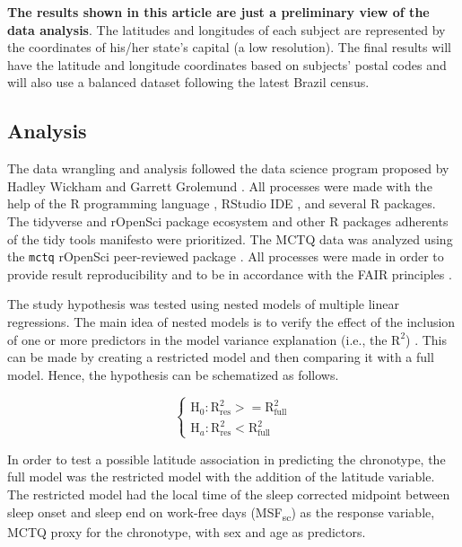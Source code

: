 \documentclass[
12pt,
openright,
oneside,
a4paper,
chapter=TITLE,
section=TITLE,
french,
spanish,
brazil,
english
]{abntex2}\usepackage{array}
\begin{document}
\textbf{The results shown in this article are just a preliminary view of
the data analysis}. The latitudes and longitudes of each subject are
represented by the coordinates of his/her state's capital (a low
resolution). The final results will have the latitude and longitude
coordinates based on subjects' postal codes and will also use a balanced
dataset following the latest Brazil census.

\subsection{Analysis}\label{analysis}

The data wrangling and analysis followed the data science program
proposed by Hadley Wickham and Garrett Grolemund \autocite{wickham2016}.
All processes were made with the help of the R programming language
\autocite{rcoreteam2023}, RStudio IDE \autocite{positteam2023}, and
several R packages. The tidyverse and rOpenSci package ecosystem and
other R packages adherents of the tidy tools manifesto
\autocite{wickham2023a} were prioritized. The MCTQ data was analyzed
using the \texttt{mctq} rOpenSci peer-reviewed package
\autocite{vartanian2023}. All processes were made in order to provide
result reproducibility and to be in accordance with the FAIR principles
\autocite{wilkinson2016}.

The study hypothesis was tested using nested models of multiple linear
regressions. The main idea of nested models is to verify the effect of
the inclusion of one or more predictors in the model variance
explanation (i.e., the \(\text{R}^{2}\)) \autocite{allen1997}. This can
be made by creating a restricted model and then comparing it with a full
model. Hence, the hypothesis can be schematized as follows.

\[
\begin{cases}
\text{H}_{0}: \text{R}^{2}_{\text{res}} >= \text{R}^{2}_{\text{full}} \\
\text{H}_{a}: \text{R}^{2}_{\text{res}} < \text{R}^{2}_{\text{full}}
\end{cases}
\]

\smallskip

In order to test a possible latitude association in predicting the
chronotype, the full model was the restricted model with the addition of
the latitude variable. The restricted model had the local time of the
sleep corrected midpoint between sleep onset and sleep end on work-free
days (MSF\textsubscript{sc}) as the response variable, MCTQ proxy for
the chronotype, with sex and age as predictors.
\end{document}
